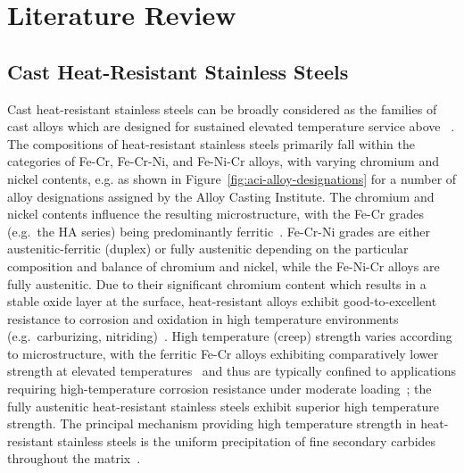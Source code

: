 \chapter{Literature Review} \label{ch:literature-review}

\section{Cast Heat-Resistant Stainless Steels}
Cast heat-resistant stainless steels can be broadly considered as the families of cast alloys which are designed for sustained elevated temperature service above ~\cite{blair_cast_stainless_1990}.  The compositions of heat-resistant stainless steels primarily fall within the categories of Fe-Cr, Fe-Cr-Ni, and Fe-Ni-Cr alloys, with varying chromium and nickel contents, e.g. as shown in Figure~\ref{fig:aci-alloy-designations} for a number of alloy designations assigned by the Alloy Casting Institute. The chromium and nickel contents influence the resulting microstructure, with the Fe-Cr grades (e.g.~the HA series) being predominantly ferritic~\cite{davis_metallurgy_1994}. Fe-Cr-Ni grades are either austenitic-ferritic (duplex) or fully austenitic depending on the particular composition and balance of chromium and nickel, while the Fe-Ni-Cr alloys are fully austenitic. Due to their significant chromium content which results in a stable oxide layer at the surface, heat-resistant alloys exhibit good-to-excellent resistance to corrosion and oxidation in high temperature environments (e.g.~carburizing, nitriding)~\cite{davis_metallurgy_1994}. High temperature (creep) strength varies according to microstructure, with the ferritic Fe-Cr alloys exhibiting comparatively lower strength at elevated temperatures~\cite{avery_cast_1969} and thus are typically confined to applications requiring high-temperature corrosion resistance under moderate loading~\cite{davis_metallurgy_1994}; the fully austenitic heat-resistant stainless steels exhibit superior high temperature strength. The principal mechanism providing high temperature strength in heat-resistant stainless steels is the uniform precipitation of fine secondary carbides throughout the matrix~\cite{avery_cast_1969,davis_metallurgy_1994}. 


